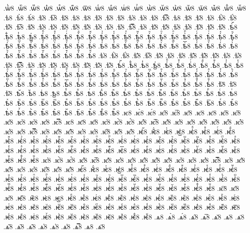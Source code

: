 {.ѡⷺ8
.ѡⷻ8
.ѡⷼ8
.ѡⷽ8
.ѡⷾ8
.ѡⷿ8
.ѡ꙯8
.ѡꙴ8
.ѡꙵ8
.ѡꙶ8
.ѡꙷ8
.ѡꙸ8
.ѡꙹ8
.ѡꙺ8
.ѡꙻ8
.ѡ꙼8
.ѡ꙽8
.ѡꚞ8
.ѡꚟ8
.ѣ8
.ѣ̀8
.ѣ́8
.ѣ̂8
.ѣ̅8
.ѣ̆8
.ѣ̇8
.ѣ̈8
.ѣ̋8
.ѣ̏8
.ѣ̑8
.ѣ̓8
.ѣ̔8
.ѣ̾8
.ѣ̿8
.ѣ͘8
.ѣ҃8
.ѣ҄8
.ѣ҅8
.ѣ҅̀8
.ѣ҅́8
.ѣ҅̂8
.ѣ҅̅8
.ѣ҅̆8
.ѣ҅̇8
.ѣ҅̈8
.ѣ҅̋8
.ѣ҅̏8
.ѣ҅̑8
.ѣ҅̓8
.ѣ҅̔8
.ѣ҅̾8
.ѣ҅̿8
.ѣ҅͘8
.ѣ҅҃8
.ѣ҅҄8
.ѣ҅҅8
.ѣ҅҆8
.ѣ҅҇8
.ѣ҅᷀8
.ѣ҅᷁8
.ѣ҅᷶8
.ѣ᷷҅8
.ѣ᷸҅8
.ѣ᷹҅8
.ѣ҅ⷠ8
.ѣ҅ⷡ8
.ѣ҅ⷢ8
.ѣ҅ⷣ8
.ѣ҅ⷤ8
.ѣ҅ⷥ8
.ѣ҅ⷦ8
.ѣ҅ⷧ8
.ѣ҅ⷨ8
.ѣ҅ⷩ8
.ѣ҅ⷪ8
.ѣ҅ⷫ8
.ѣ҅ⷬ8
.ѣ҅ⷭ8
.ѣ҅ⷮ8
.ѣ҅ⷯ8
.ѣ҅ⷰ8
.ѣ҅ⷱ8
.ѣ҅ⷲ8
.ѣ҅ⷳ8
.ѣ҅ⷴ8
.ѣ҅ⷵ8
.ѣ҅ⷶ8
.ѣ҅ⷷ8
.ѣ҅ⷸ8
.ѣ҅ⷹ8
.ѣ҅ⷺ8
.ѣ҅ⷻ8
.ѣ҅ⷼ8
.ѣ҅ⷽ8
.ѣ҅ⷾ8
.ѣ҅ⷿ8
.ѣ҅꙯8
.ѣ҅ꙴ8
.ѣ҅ꙵ8
.ѣ҅ꙶ8
.ѣ҅ꙷ8
.ѣ҅ꙸ8
.ѣ҅ꙹ8
.ѣ҅ꙺ8
.ѣ҅ꙻ8
.ѣ҅꙼8
.ѣ҅꙽8
.ѣ҅ꚞ8
.ѣ҅ꚟ8
.ѣ҆8
.ѣ҆̀8
.ѣ҆́8
.ѣ҆̂8
.ѣ҆̅8
.ѣ҆̆8
.ѣ҆̇8
.ѣ҆̈8
.ѣ҆̋8
.ѣ҆̏8
.ѣ҆̑8
.ѣ҆̓8
.ѣ҆̔8
.ѣ҆̾8
.ѣ҆̿8
.ѣ҆͘8
.ѣ҆҃8
.ѣ҆҄8
.ѣ҆҅8
.ѣ҆҆8
.ѣ҆҇8
.ѣ҆᷀8
.ѣ҆᷁8
.ѣ҆᷶8
.ѣ᷷҆8
.ѣ᷸҆8
.ѣ᷹҆8
.ѣ҆ⷠ8
.ѣ҆ⷡ8
.ѣ҆ⷢ8
.ѣ҆ⷣ8
.ѣ҆ⷤ8
.ѣ҆ⷥ8
.ѣ҆ⷦ8
.ѣ҆ⷧ8
.ѣ҆ⷨ8
.ѣ҆ⷩ8
.ѣ҆ⷪ8
.ѣ҆ⷫ8
.ѣ҆ⷬ8
.ѣ҆ⷭ8
.ѣ҆ⷮ8
.ѣ҆ⷯ8
.ѣ҆ⷰ8
.ѣ҆ⷱ8
.ѣ҆ⷲ8
.ѣ҆ⷳ8
.ѣ҆ⷴ8
.ѣ҆ⷵ8
.ѣ҆ⷶ8
.ѣ҆ⷷ8
.ѣ҆ⷸ8
.ѣ҆ⷹ8
.ѣ҆ⷺ8
.ѣ҆ⷻ8
.ѣ҆ⷼ8
.ѣ҆ⷽ8
.ѣ҆ⷾ8
.ѣ҆ⷿ8
.ѣ҆꙯8
.ѣ҆ꙴ8
.ѣ҆ꙵ8
.ѣ҆ꙶ8
.ѣ҆ꙷ8
.ѣ҆ꙸ8
.ѣ҆ꙹ8
.ѣ҆ꙺ8
.ѣ҆ꙻ8
.ѣ҆꙼8
.ѣ҆꙽8
.ѣ҆ꚞ8
.ѣ҆ꚟ8
.ѣ҇8
.ѣ᷀8
.ѣ᷁8
.ѣ᷶8
.ѣ᷷8
.ѣ᷸8
.ѣ᷹8
.ѣⷠ8
.ѣⷡ8
.ѣⷢ8
.ѣⷣ8
.ѣⷤ8
.ѣⷥ8
.ѣⷦ8
.ѣⷧ8
.ѣⷨ8
.ѣⷩ8
.ѣⷪ8
.ѣⷫ8
.ѣⷬ8
.ѣⷭ8
.ѣⷮ8
.ѣⷯ8
.ѣⷰ8
.ѣⷱ8
.ѣⷲ8
.ѣⷳ8
.ѣⷴ8
.ѣⷵ8
.ѣⷶ8
.ѣⷷ8
.ѣⷸ8
.ѣⷹ8
.ѣⷺ8
.ѣⷻ8
.ѣⷼ8
.ѣⷽ8
.ѣⷾ8
.ѣⷿ8
.ѣ꙯8
.ѣꙴ8
.ѣꙵ8
.ѣꙶ8
.ѣꙷ8
.ѣꙸ8
.ѣꙹ8
.ѣꙺ8
.ѣꙻ8
.ѣ꙼8
.ѣ꙽8
.ѣꚞ8
.ѣꚟ8
.ѥ8
.ѥ̀8
.ѥ́8
.ѥ̂8
.ѥ̅8
.ѥ̆8
.ѥ̇8
.ѥ̈8
.ѥ̋8
.ѥ̏8
.ѥ̑8
.ѥ̓8
.ѥ̔8
.ѥ̾8
.ѥ̿8
.ѥ͘8
.ѥ҃8
.ѥ҄8
.ѥ҅8
.ѥ҅̀8
.ѥ҅́8
.ѥ҅̂8
.ѥ҅̅8
.ѥ҅̆8
.ѥ҅̇8
.ѥ҅̈8
.ѥ҅̋8
.ѥ҅̏8
.ѥ҅̑8
.ѥ҅̓8
.ѥ҅̔8
.ѥ҅̾8
.ѥ҅̿8
.ѥ҅͘8
.ѥ҅҃8
.ѥ҅҄8
.ѥ҅҅8
.ѥ҅҆8
.ѥ҅҇8
.ѥ҅᷀8
.ѥ҅᷁8
.ѥ҅᷶8
.ѥ᷷҅8
.ѥ᷸҅8
.ѥ᷹҅8
.ѥ҅ⷠ8
.ѥ҅ⷡ8
.ѥ҅ⷢ8
.ѥ҅ⷣ8
.ѥ҅ⷤ8
.ѥ҅ⷥ8
.ѥ҅ⷦ8
.ѥ҅ⷧ8
.ѥ҅ⷨ8
.ѥ҅ⷩ8
.ѥ҅ⷪ8
.ѥ҅ⷫ8
.ѥ҅ⷬ8
.ѥ҅ⷭ8
.ѥ҅ⷮ8
.ѥ҅ⷯ8
.ѥ҅ⷰ8
.ѥ҅ⷱ8
.ѥ҅ⷲ8
.ѥ҅ⷳ8
.ѥ҅ⷴ8
.ѥ҅ⷵ8
.ѥ҅ⷶ8
.ѥ҅ⷷ8
.ѥ҅ⷸ8
.ѥ҅ⷹ8
.ѥ҅ⷺ8
.ѥ҅ⷻ8
.ѥ҅ⷼ8
.ѥ҅ⷽ8
.ѥ҅ⷾ8
.ѥ҅ⷿ8
.ѥ҅꙯8
.ѥ҅ꙴ8
.ѥ҅ꙵ8
.ѥ҅ꙶ8
.ѥ҅ꙷ8
.ѥ҅ꙸ8
.ѥ҅ꙹ8
.ѥ҅ꙺ8
.ѥ҅ꙻ8
.ѥ҅꙼8
.ѥ҅꙽8
.ѥ҅ꚞ8
.ѥ҅ꚟ8
.ѥ҆8
.ѥ҆̀8
.ѥ҆́8
.ѥ҆̂8
.ѥ҆̅8
.ѥ҆̆8
.ѥ҆̇8
.ѥ҆̈8
.ѥ҆̋8
.ѥ҆̏8
.ѥ҆̑8
.ѥ҆̓8
.ѥ҆̔8
.ѥ҆̾8
.ѥ҆̿8
.ѥ҆͘8
.ѥ҆҃8
.ѥ҆҄8
.ѥ҆҅8
.ѥ҆҆8
.ѥ҆҇8
.ѥ҆᷀8
.ѥ҆᷁8
.ѥ҆᷶8
.ѥ᷷҆8
.ѥ᷸҆8
.ѥ᷹҆8
.ѥ҆ⷠ8
.ѥ҆ⷡ8
.ѥ҆ⷢ8
.ѥ҆ⷣ8
.ѥ҆ⷤ8
.ѥ҆ⷥ8
.ѥ҆ⷦ8
.ѥ҆ⷧ8
.ѥ҆ⷨ8
.ѥ҆ⷩ8
.ѥ҆ⷪ8
.ѥ҆ⷫ8
.ѥ҆ⷬ8
.ѥ҆ⷭ8
.ѥ҆ⷮ8
.ѥ҆ⷯ8
.ѥ҆ⷰ8
.ѥ҆ⷱ8
.ѥ҆ⷲ8
.ѥ҆ⷳ8
.ѥ҆ⷴ8
.ѥ҆ⷵ8
.ѥ҆ⷶ8
.ѥ҆ⷷ8
.ѥ҆ⷸ8
.ѥ҆ⷹ8
.ѥ҆ⷺ8
.ѥ҆ⷻ8
.ѥ҆ⷼ8
.ѥ҆ⷽ8
.ѥ҆ⷾ8
.ѥ҆ⷿ8
.ѥ҆꙯8
.ѥ҆ꙴ8
.ѥ҆ꙵ8
.ѥ҆ꙶ8
.ѥ҆ꙷ8
.ѥ҆ꙸ8
.ѥ҆ꙹ8
.ѥ҆ꙺ8
.ѥ҆ꙻ8
.ѥ҆꙼8
.ѥ҆꙽8
.ѥ҆ꚞ8
.ѥ҆ꚟ8
.ѥ҇8
.ѥ᷀8
.ѥ᷁8
.ѥ᷶8
.ѥ᷷8
.ѥ᷸8
.ѥ᷹8
.ѥⷠ8
.ѥⷡ8
.ѥⷢ8
.ѥⷣ8
.ѥⷤ8
.ѥⷥ8
.ѥⷦ8
.ѥⷧ8
.ѥⷨ8
.ѥⷩ8
.ѥⷪ8
.ѥⷫ8
.ѥⷬ8
.ѥⷭ8
.ѥⷮ8
.ѥⷯ8
.ѥⷰ8
.ѥⷱ8
.ѥⷲ8
.ѥⷳ8
.ѥⷴ8
.ѥⷵ8
.ѥⷶ8
.ѥⷷ8
.ѥⷸ8
.ѥⷹ8
.ѥⷺ8
.ѥⷻ8
.ѥⷼ8
.ѥⷽ8
.ѥⷾ8
.ѥⷿ8
.ѥ꙯8
.ѥꙴ8
.ѥꙵ8
.ѥꙶ8
.ѥꙷ8
.ѥꙸ8
.ѥꙹ8
.ѥꙺ8
.ѥꙻ8
.ѥ꙼8
.ѥ꙽8
.ѥꚞ8
.ѥꚟ8
.ѧ8
.ѧ̀8
.ѧ́8
.ѧ̂8
.ѧ̅8
.ѧ̆8
.ѧ̇8
.ѧ̈8
.ѧ̋8
.ѧ̏8
.ѧ̑8
.ѧ̓8
.ѧ̔8
.ѧ̾8
.ѧ̿8
.ѧ͘8
.ѧ҃8
}
